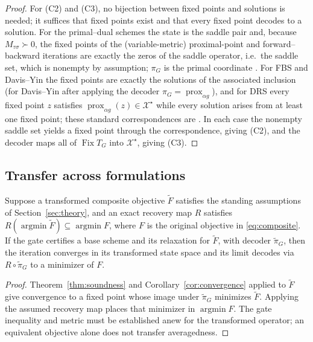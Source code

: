\begin{proof}
For (C2) and (C3), no bijection between fixed points and solutions is
needed; it suffices that fixed points exist and that every fixed point
decodes to a solution. For the primal--dual schemes the state is the saddle
pair and, because $M_{\tau\sigma}\succ0$, the fixed points of the
(variable-metric) proximal-point and forward--backward iterations are
exactly the zeros of the saddle operator, i.e.\ the saddle set, which is
nonempty by assumption; $\pi_G$ is the primal coordinate
\citep[\S3.3]{RyuYin2022LargeScale}. For FBS and Davis--Yin the fixed points
are exactly the solutions of the associated inclusion (for Davis--Yin after
applying the decoder $\pi_G=\operatorname{prox}_{\alpha g}$), and for DRS
every fixed point $z$ satisfies
$\operatorname{prox}_{\alpha g}(z)\in\mathcal X^\star$ while every solution
arises from at least one fixed point; these standard correspondences are
\citep[\S2.7]{RyuYin2022LargeScale}. In each case the nonempty saddle set
yields a fixed point through the correspondence, giving (C2), and the
decoder maps all of $\operatorname{Fix}T_G$ into $\mathcal X^\star$, giving
(C3).
\end{proof}

\subsection{Transfer across formulations}

\begin{proposition}
\label{prop:formulation-transfer}
Suppose a transformed composite objective $\widetilde F$ satisfies the
standing assumptions of Section~\ref{sec:theory}, and an exact recovery
map $R$ satisfies
$R(\operatorname*{argmin}\widetilde F)\subseteq
\operatorname*{argmin}F$, where $F$ is the original objective in
\eqref{eq:composite}. If the gate certifies a base scheme and its
relaxation for $\widetilde F$, with decoder $\widetilde\pi_G$, then the
iteration converges in its transformed state space and its limit decodes
via $R\circ\widetilde\pi_G$ to a minimizer of $F$.
\end{proposition}

\begin{proof}
Theorem~\ref{thm:soundness} and Corollary~\ref{cor:convergence} applied
to $\widetilde F$ give convergence to a fixed point whose image under
$\widetilde\pi_G$ minimizes $\widetilde F$. Applying the assumed recovery
map places that minimizer in $\operatorname*{argmin}F$. The gate inequality
and metric must be established anew for the transformed operator; an
equivalent objective alone does not transfer averagedness.
\end{proof}


